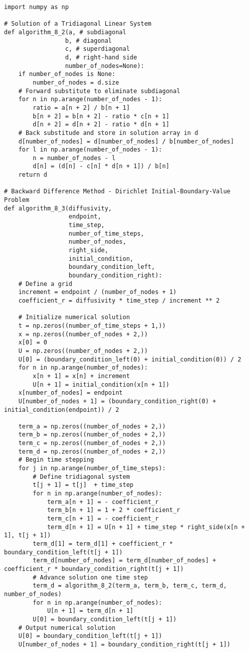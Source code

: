 \documentclass{amsbook}%
\theoremstyle{plain}
\numberwithin{equation}{section}
\begin{document}
\begin{small}
\begin{verbatim}
import numpy as np

# Solution of a Tridiagonal Linear System
def algorithm_8_2(a, # subdiagonal
                 b, # diagonal
                 c, # superdiagonal
                 d, # right-hand side
                 number_of_nodes=None):
    if number_of_nodes is None:
        number_of_nodes = d.size
    # Forward substitute to eliminate subdiagonal
    for n in np.arange(number_of_nodes - 1):
        ratio = a[n + 2] / b[n + 1]
        b[n + 2] = b[n + 2] - ratio * c[n + 1]
        d[n + 2] = d[n + 2] - ratio * d[n + 1]
    # Back substitude and store in solution array in d
    d[number_of_nodes] = d[number_of_nodes] / b[number_of_nodes]
    for l in np.arange(number_of_nodes - 1):
        n = number_of_nodes - l
        d[n] = (d[n] - c[n] * d[n + 1]) / b[n]
    return d
        
# Backward Difference Method - Dirichlet Initial-Boundary-Value Problem
def algorithm_8_3(diffusivity,
                  endpoint,
                  time_step,
                  number_of_time_steps,
                  number_of_nodes,
                  right_side,
                  initial_condition,
                  boundary_condition_left,
                  boundary_condition_right):
    # Define a grid
    increment = endpoint / (number_of_nodes + 1)
    coefficient_r = diffusivity * time_step / increment ** 2
        
    # Initialize numerical solution
    t = np.zeros((number_of_time_steps + 1,))
    x = np.zeros((number_of_nodes + 2,))
    x[0] = 0
    U = np.zeros((number_of_nodes + 2,))
    U[0] = (boundary_condition_left(0) + initial_condition(0)) / 2
    for n in np.arange(number_of_nodes):
        x[n + 1] = x[n] + increment
        U[n + 1] = initial_condition(x[n + 1])
    x[number_of_nodes] = endpoint
    U[number_of_nodes + 1] = (boundary_condition_right(0) + initial_condition(endpoint)) / 2

    term_a = np.zeros((number_of_nodes + 2,))
    term_b = np.zeros((number_of_nodes + 2,))
    term_c = np.zeros((number_of_nodes + 2,))
    term_d = np.zeros((number_of_nodes + 2,))    
    # Begin time stepping  
    for j in np.arange(number_of_time_steps):
        # Define tridiagonal system
        t[j + 1] = t[j]  + time_step
        for n in np.arange(number_of_nodes):
            term_a[n + 1] = - coefficient_r
            term_b[n + 1] = 1 + 2 * coefficient_r
            term_c[n + 1] = - coefficient_r
            term_d[n + 1] = U[n + 1] + time_step * right_side(x[n + 1], t[j + 1])
        term_d[1] = term_d[1] + coefficient_r * boundary_condition_left(t[j + 1])
        term_d[number_of_nodes] = term_d[number_of_nodes] + coefficient_r * boundary_condition_right(t[j + 1])
        # Advance solution one time step
        term_d = algorithm_8_2(term_a, term_b, term_c, term_d, number_of_nodes)
        for n in np.arange(number_of_nodes):
            U[n + 1] = term_d[n + 1]
        U[0] = boundary_condition_left(t[j + 1])        
    # Output numerical solution        
    U[0] = boundary_condition_left(t[j + 1])
    U[number_of_nodes + 1] = boundary_condition_right(t[j + 1])


\end{verbatim}
\end{small}
\end{document}
